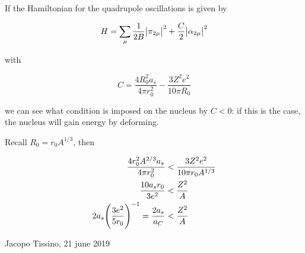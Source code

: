 \documentclass{article}
\begin{document}
If the Hamiltonian for the quadrupole oscillations is given by

\begin{equation}
    H = \sum_{\mu} \frac{1}{2B} \abs{\pi_{2\mu}}^2 + \frac{C}{2} \abs{\alpha_{2\mu}}^2
\end{equation}

with

\begin{equation}
    C = \frac{4 R_0^2 a_s}{4 \pi r_0^2} - \frac{3Z^2 e^2}{10 \pi R_0}
\end{equation}

we can see what condition is imposed on the nucleus by \(C<0\): if this is the case, the nucleus will gain energy by deforming.

Recall \(R_0 = r_0 A^{1/3}\), then

\begin{subequations}
\begin{align}
  \frac{4 r_0^2 A^{2/3} a_s}{4 \pi r_0^2} &< \frac{3Z^2 e^2}{10 \pi r_0 A^{1/3}}  \\
  \frac{10 a_s r_0}{3 e^2} &< \frac{Z^2}{A}  \\
  2a_s  \qty(\frac{3e^2}{5r_0})^{-1} = \frac{2 a_s}{a_C} &< \frac{Z^2}{A}
\end{align}
\end{subequations}




\begin{flushright}
    Jacopo Tissino, 21 june 2019
\end{flushright}
\end{document}
